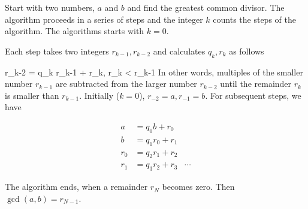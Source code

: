 


Start with two numbers, $a$ and $b$ and find the greatest common divisor. The algorithm proceeds in a series of steps and the integer $k$ counts the steps of the algorithm. The algorithms starts with $k=0$.

Each step takes two integers $r_{k-1}, r_{k-2}$ and calculates $q_k, r_k$ as follows

\bee
r_{k-2} = q_k r_{k-1} + r_k, \qquad r_k < r_{k-1}
\eee
%
In other words, multiples of the smaller number $r_{k−1}$ are subtracted from the larger number $r_{k−2}$ until the remainder $r_k$ is smaller than $r_{k−1}$.
%
Initially ($k=0$), $r_{-2} = a, r_{-1} = b$. For subsequent steps, we have

\begin{align*}
  a &= q_0 b + r_0 \\
  b &= q_1 r_0 + r_1 \\
  r_0 &= q_2 r_1 + r_2 \\
  r_1 &= q_3 r_2 + r_3
  &\cdots  
\end{align*}

The algorithm ends, when a remainder $r_N$ becomes zero. Then $\gcd(a,b) = r_{N-1}$.
